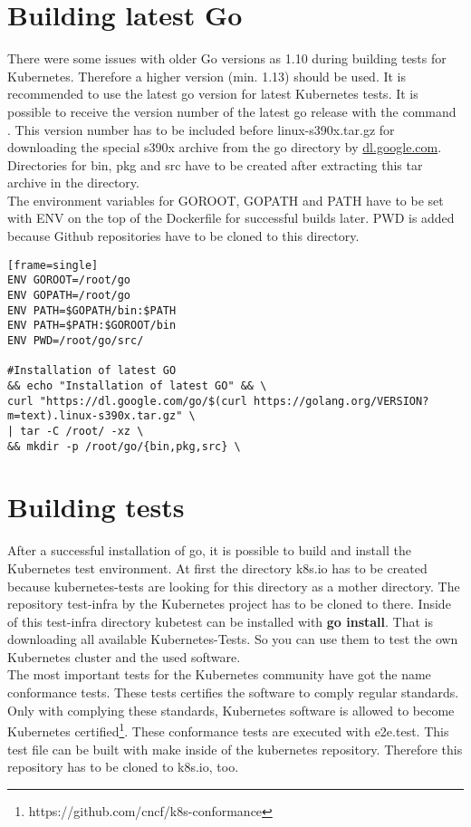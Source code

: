 \section{Building latest Go}

There were some issues with older Go versions as 1.10 during building tests for Kubernetes. Therefore a higher version (min. 1.13) should be used. It is recommended to use the latest go version for latest Kubernetes tests. It is possible to receive the version number of the latest go release with the command . This version number has to be included before linux-s390x.tar.gz for downloading the special s390x archive from the go directory by \url{dl.google.com}. Directories for bin, pkg and src have to be created after extracting this tar archive in the  directory. \\

The environment variables for GOROOT, GOPATH and PATH have to be set with ENV on the top of the Dockerfile for successful builds later. PWD is added because Github repositories have to be cloned to this directory.

\begin{verbatim}[frame=single]
ENV GOROOT=/root/go
ENV GOPATH=/root/go
ENV PATH=$GOPATH/bin:$PATH
ENV PATH=$PATH:$GOROOT/bin
ENV PWD=/root/go/src/

#Installation of latest GO
&& echo "Installation of latest GO" && \
curl "https://dl.google.com/go/$(curl https://golang.org/VERSION?m=text).linux-s390x.tar.gz" \
| tar -C /root/ -xz \
&& mkdir -p /root/go/{bin,pkg,src} \
\end{verbatim}

\section{Building tests}
After a successful installation of go, it is possible to build and install the Kubernetes test environment.
At first the directory k8s.io has to be created because kubernetes-tests are looking for this directory as a mother directory. The repository test-infra by the Kubernetes project has to be cloned to there. Inside of this test-infra directory kubetest can be installed with \textbf{go install}. That is downloading all available Kubernetes-Tests. So you can use them to test the own Kubernetes cluster and the used software. \\

The most important tests for the Kubernetes community have got the name conformance tests. These tests certifies the software to comply regular standards. Only with complying these standards, Kubernetes software is allowed to become Kubernetes certified\footnote{https://github.com/cncf/k8s-conformance}. 
These conformance tests are executed with e2e.test. This test file can be built with make inside of the kubernetes repository. Therefore this repository has to be cloned to k8s.io, too.


